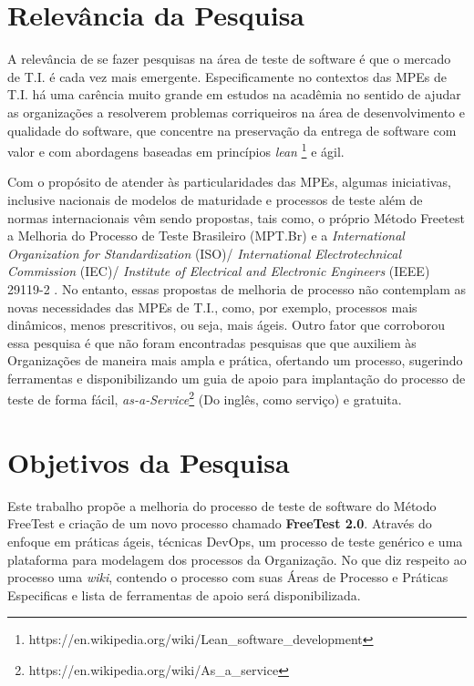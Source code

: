 \section{Relevância da Pesquisa}

A relevância de se fazer pesquisas na área de teste de software é que o mercado de T.I. é cada vez mais emergente. Especificamente no contextos das MPEs de T.I. há uma carência muito grande em estudos na acadêmia no sentido de ajudar as organizações a resolverem problemas corriqueiros na área de desenvolvimento e qualidade do software, que concentre na preservação da entrega de software com valor e com abordagens baseadas em princípios \textit{lean} \footnote{https://en.wikipedia.org/wiki/Lean_software_development} e ágil.

Com o propósito de atender às particularidades das MPEs, algumas iniciativas, inclusive nacionais de modelos de maturidade e processos de teste além de normas internacionais vêm sendo propostas, tais como, o próprio Método Freetest \cite{Camilo-junior2012} a Melhoria do Processo de Teste Brasileiro (MPT.Br) \cite{GuiaMPTbr} e a \textit{International Organization for Standardization} (ISO)/ \textit{International Electrotechnical Commission} (IEC)/ \textit{Institute of Electrical and Electronic Engineers} (IEEE) 29119-2 \cite{Standard2013}. No entanto, essas propostas de melhoria de processo não contemplam as novas necessidades das MPEs de T.I., como, por exemplo, processos mais dinâmicos, menos prescritivos, ou seja, mais ágeis. Outro fator que corroborou essa pesquisa é que não foram encontradas pesquisas que que auxiliem às Organizações de maneira mais ampla e prática, ofertando um processo, sugerindo ferramentas e disponibilizando um guia de apoio para implantação do processo de teste de forma fácil, \textit{as-a-Service}\footnote{https://en.wikipedia.org/wiki/As_a_service} (Do inglês, como serviço) e gratuita.

\section{Objetivos da Pesquisa}
\label{cap:objetivos}

Este trabalho propõe a melhoria do processo de teste de software do Método FreeTest \cite{Camilo-junior2012} e criação de um novo processo chamado \textbf{FreeTest 2.0}. Através do enfoque em práticas ágeis, técnicas DevOps, um processo de teste genérico e uma plataforma para modelagem dos processos da Organização. No que diz respeito ao processo uma \textit{wiki}, contendo o processo com suas Áreas de Processo e Práticas Especificas e lista de ferramentas de apoio será disponibilizada. 

